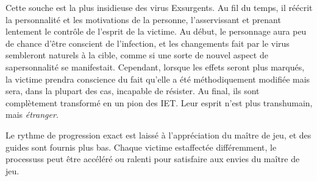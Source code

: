 Cette souche est la plus insidieuse des virus Exsurgents. Au fil du temps, il réécrit la personnalité et les motivations de la personne, l'asservissant et prenant lentement le contrôle de l'esprit de la victime. Au début, le personnage aura peu de chance d'être conscient de l'infection, et les changements fait par le virus sembleront naturels à la cible, comme si une sorte de nouvel aspect de sapersonnalité se manifestait. Cependant, lorsque les effets seront plus marqués, la victime prendra conscience du fait qu'elle a été méthodiquement modifiée mais sera, dans la plupart des cas, incapable de résister. Au final, ils sont complètement transformé en un pion des IET. Leur esprit n'est plus transhumain, mais \textit{étranger.} 

Le rythme de progression exact est laissé à l'appréciation du maître de jeu, et des guides sont fournis plus bas. Chaque victime estaffectée différemment, le processuss peut être accéléré ou ralenti pour satisfaire aux envies du maître de jeu. 

